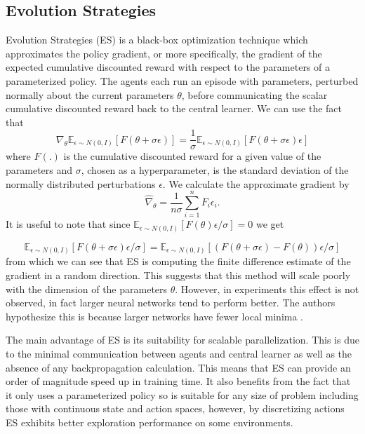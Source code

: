 \subsection{Evolution Strategies}
Evolution Strategies (ES) \cite{ES} is a black-box optimization technique which approximates the policy gradient, or more specifically, the gradient of the expected cumulative discounted reward with respect to the parameters of a parameterized policy.
The agents each run an episode with parameters, perturbed normally about the current parameters $\theta$, before communicating the scalar cumulative discounted reward back to the central learner.
We can use the fact that
\begin{equation*}
        \nabla_\theta \mathbb{E}_{\epsilon \sim N(0,I)}[F(\theta+\sigma \epsilon)] = \frac{1}{\sigma}\mathbb{E}_{\epsilon \sim N(0,I)}[F(\theta+\sigma \epsilon) \epsilon]
\end{equation*}
where $F(.)$ is the cumulative discounted reward for a given value of the parameters and $\sigma$, chosen as a hyperparameter, is the standard deviation of the normally distributed perturbations $\epsilon$.
We calculate the approximate gradient by
\begin{equation}
        \hat{\nabla}_\theta = \frac{1}{n\sigma}\sum^n_{i=1} F_i \epsilon_i.
        \label{eq:grad}
\end{equation}
It is useful to note that since $\mathbb{E}_{\epsilon \sim N(0,I)}[F(\theta)\epsilon/\sigma] = 0$ we get

\begin{equation*}
    \mathbb{E}_{\epsilon \sim N(0,I)}[F(\theta+\sigma \epsilon) \epsilon/\sigma] = \mathbb{E}_{\epsilon \sim N(0,I)}[(F(\theta+\sigma \epsilon) - F(\theta))\epsilon/\sigma]
\end{equation*}
from which we can see that ES is computing the finite difference estimate of the gradient in a random direction. This suggests that this method will scale poorly with the dimension of the parameters $\theta$. However, in experiments this effect is not observed, in fact larger neural networks tend to perform better. The authors hypothesize this is because larger networks have fewer local minima \cite{LocalMinima}.

The main advantage of ES is its suitability for scalable parallelization. This is due to the minimal communication between agents and central learner as well as the absence of any backpropagation calculation. This means that ES can provide an order of magnitude speed up in training time. It also benefits from the fact that it only uses a parameterized policy so is suitable for any size of problem including those with continuous state and action spaces, however, by discretizing actions ES exhibits better exploration performance on some environments.

